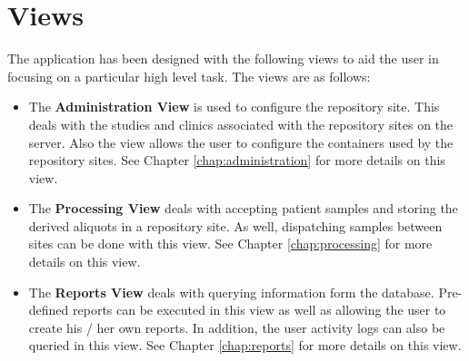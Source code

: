 \section{Views}
\label{sec:application_views}

The application has been designed with the following views to aid the user in
focusing on a particular high level task. The views are as follows:
\begin{itemize}
\item The \textbf{Administration View} is used to configure the repository
  site. This deals with the studies and clinics associated with the
  repository sites on the server. Also the view allows the user to configure
  the containers used by the repository sites. See Chapter
  \ref{chap:administration} for more details on this view.
\item The \textbf{Processing View} deals with accepting patient samples and
  storing the derived aliquots in a repository site. As well, dispatching
  samples between sites can be done with this view. See Chapter
  \ref{chap:processing} for more details on this view.
\item The \textbf{Reports View} deals with querying information form the
  database. Pre-defined reports can be executed in this view as well as
  allowing the user to create his / her own reports. In addition, the user
  activity logs can also be queried in this view.  See Chapter
  \ref{chap:reports} for more details on this view.
\end{itemize}
